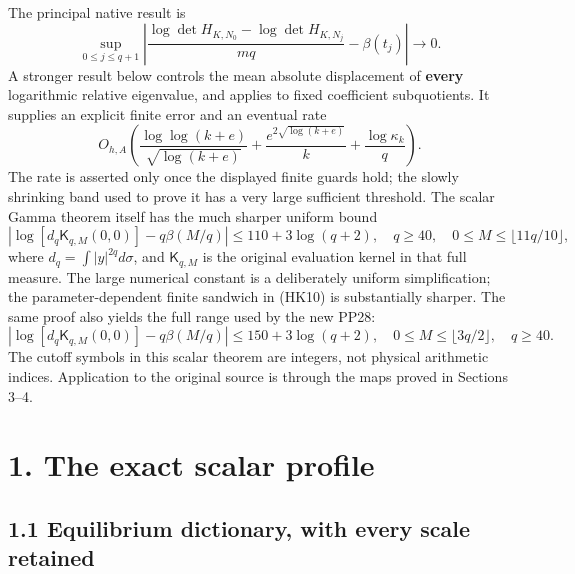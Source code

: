 \documentclass[10pt]{article}
\begin{document}
The principal native result is \[
 \boxed{\sup_{0\le j\le q+1}
 \left|\frac{\log\det H_{K,N_0}-\log\det H_{K,N_j}}{mq}
       -\beta(t_j)\right|\longrightarrow0.}
 \tag{CU5}
\] A stronger result below controls the mean absolute displacement of \textbf{every} logarithmic relative eigenvalue, and applies to fixed coefficient subquotients. It supplies an explicit finite error and an eventual rate \[
 O_{h,A}\!\left(
 \frac{\log\log(k+e)}{\sqrt{\log(k+e)}}
 +\frac{e^{2\sqrt{\log(k+e)}}}{k}
 +\frac{\log\kappa_k}{q}\right).
 \tag{CU6}
\] The rate is asserted only once the displayed finite guards hold; the slowly shrinking band used to prove it has a very large sufficient threshold. The scalar Gamma theorem itself has the much sharper uniform bound \[
 \boxed{\left|\log[d_q\mathsf K_{q,M}(0,0)]-q\beta(M/q)\right|
 \le110+3\log(q+2),}
 \quad q\ge40,\quad 0\le M\le\lfloor11q/10\rfloor,
 \tag{CU7}
\] where \(d_q=\int |y|^{2q}d\sigma\), and \(\mathsf K_{q,M}\) is the original evaluation kernel in that full measure. The large numerical constant is a deliberately uniform simplification; the parameter-dependent finite sandwich in (HK10) is substantially sharper. The same proof also yields the full range used by the new PP28: \[
 \boxed{\left|\log[d_q\mathsf K_{q,M}(0,0)]-q\beta(M/q)\right|
 \le150+3\log(q+2),\quad
 0\le M\le\lfloor3q/2\rfloor,\quad q\ge40.}
 \tag{CU7a}
\] The cutoff symbols in this scalar theorem are integers, not physical arithmetic indices. Application to the original source is through the maps proved in Sections 3--4.

\section{1. The exact scalar profile}\label{the-exact-scalar-profile}

\subsection{1.1 Equilibrium dictionary, with every scale retained}\label{equilibrium-dictionary-with-every-scale-retained}
\end{document}

